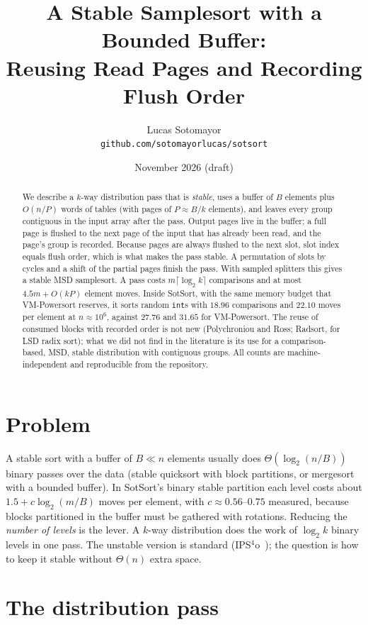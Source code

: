 \documentclass[11pt]{article}
\title{A Stable Samplesort with a Bounded Buffer:\\
Reusing Read Pages and Recording Flush Order}
\author{Lucas Sotomayor\\\small\texttt{github.com/sotomayorlucas/sotsort}}
\date{November 2026 \quad (draft)}
\theoremstyle{remark}
\renewcommand{\lg}{\log_2}
\begin{document}
\maketitle

\begin{abstract}
We describe a $k$-way distribution pass that is \emph{stable}, uses a buffer of
$B$ elements plus $O(n/P)$ words of tables (with pages of $P\approx B/k$
elements), and leaves every group contiguous in the input array after the
pass. Output pages live in the buffer; a full page is flushed to the next page
of the input that has already been read, and the page's group is recorded.
Because pages are always flushed to the next slot, slot index equals flush
order, which is what makes the pass stable. A permutation of slots by cycles
and a shift of the partial pages finish the pass. With sampled splitters this
gives a stable MSD samplesort. A pass costs $m\lceil\lg k\rceil$ comparisons and
at most $4.5m+O(kP)$ element moves. Inside SotSort, with the same memory
budget that VM-Powersort reserves, it sorts random \texttt{int}s with
$18.96$ comparisons and $22.10$ moves per element at $n\approx10^6$, against
$27.76$ and $31.65$ for VM-Powersort. The reuse of consumed blocks with recorded
order is not new (Polychroniou and Ross; Radsort, for LSD radix sort); what we
did not find in the literature is its use for a comparison-based, MSD,
stable distribution with contiguous groups. All counts are machine-independent
and reproducible from the repository.
\end{abstract}

\section{Problem}

A stable sort with a buffer of $B\ll n$ elements usually does $\Theta(\lg(n/B))$
binary passes over the data (stable quicksort with block partitions, or
mergesort with a bounded buffer). In SotSort's binary stable partition each
level costs about $1.5+c\lg(m/B)$ moves per element, with $c\approx0.56$--$0.75$
measured, because blocks partitioned in the buffer must be gathered with
rotations. Reducing the \emph{number of levels} is the lever. A $k$-way
distribution does the work of $\lg k$ binary levels in one pass. The unstable
version is standard (IPS$^4$o~\cite{ips4o}); the question is how to keep it
stable without $\Theta(n)$ extra space.

\section{The distribution pass}
\end{document}
